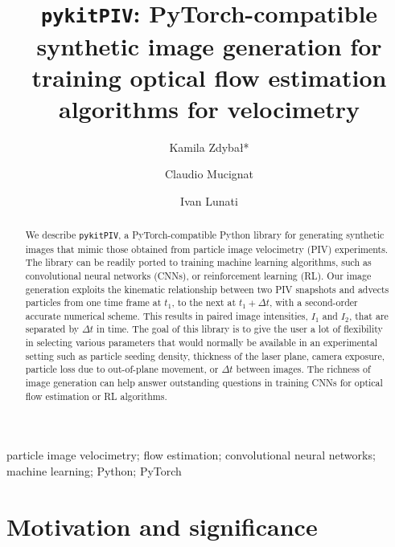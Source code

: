 \documentclass[a4paper,fleqn]{cas-dc}
\begin{document}


\title [mode = title]{\texttt{pykitPIV}: PyTorch-compatible synthetic image generation for training optical flow estimation algorithms for velocimetry}

\author[EMPA]{Kamila Zdyba\l{}*}

\author[EMPA]{Claudio Mucignat}
\author[EMPA]{Ivan Lunati}

\address[EMPA]{Laboratory for Computational Engineering, Swiss Federal Laboratories for Materials Science and Technology, Empa, Dübendorf, Switzerland}

\begin{abstract} 
We describe \texttt{pykitPIV}, a PyTorch-compatible Python library for generating synthetic images that mimic those obtained from particle image velocimetry (PIV) experiments. The library can be readily ported to training machine learning algorithms, such as convolutional neural networks (CNNs), or reinforcement learning (RL). Our image generation exploits the kinematic relationship between two PIV snapshots and advects particles from one time frame at $t_1$, to the next at $t_1 + \Delta t$, with a second-order accurate numerical scheme. This results in paired image intensities, $I_1$ and $I_2$, that are separated by $\Delta t$ in time. The goal of this library is to give the user a lot of flexibility in selecting various parameters that would normally be available in an experimental setting such as particle seeding density, thickness of the laser plane, camera exposure, particle loss due to out-of-plane movement, or $\Delta t$ between images. The richness of image generation can help answer outstanding questions in training CNNs for optical flow estimation or RL algorithms.
\end{abstract}

\begin{keywords}
particle image velocimetry; flow estimation; convolutional neural networks; machine learning; Python; PyTorch
\end{keywords}

\maketitle

\section{Motivation and significance\label{sec:introduction}}
\end{document}
